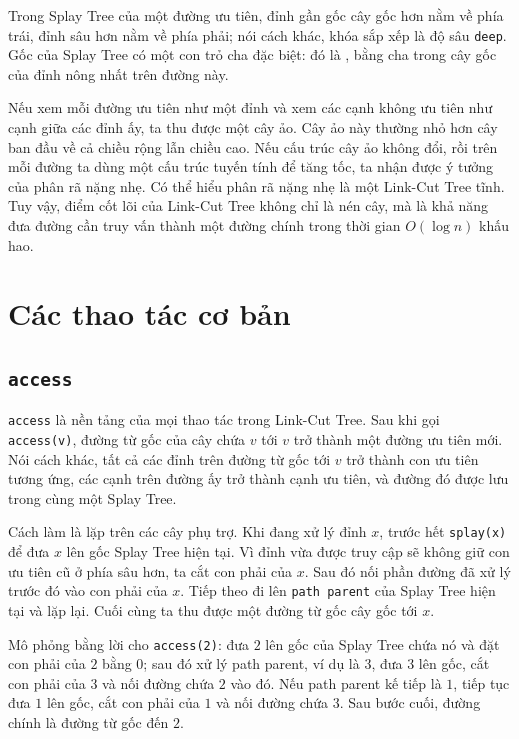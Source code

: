 \documentclass[11pt]{article}
\begin{document}
Trong Splay Tree của một đường ưu tiên, đỉnh gần gốc cây gốc hơn nằm về phía
trái, đỉnh sâu hơn nằm về phía phải; nói cách khác, khóa sắp xếp là độ sâu
\texttt{deep}.  Gốc của Splay Tree có một con trỏ cha đặc biệt: đó là
, bằng cha trong cây gốc của đỉnh nông nhất trên đường này.

Nếu xem mỗi đường ưu tiên như một đỉnh và xem các cạnh không ưu tiên như cạnh
giữa các đỉnh ấy, ta thu được một cây ảo.  Cây ảo này thường nhỏ hơn cây ban
đầu về cả chiều rộng lẫn chiều cao.  Nếu cấu trúc cây ảo không đổi, rồi trên
mỗi đường ta dùng một cấu trúc tuyến tính để tăng tốc, ta nhận được ý tưởng của
phân rã nặng nhẹ.  Có thể hiểu phân rã nặng nhẹ là một Link-Cut Tree tĩnh.  Tuy
vậy, điểm cốt lõi của Link-Cut Tree không chỉ là nén cây, mà là khả năng đưa
đường cần truy vấn thành một đường chính trong thời gian $O(\log n)$ khấu hao.

\section{Các thao tác cơ bản}

\subsection{\texttt{access}}

\texttt{access} là nền tảng của mọi thao tác trong Link-Cut Tree.  Sau khi gọi
\texttt{access(v)}, đường từ gốc của cây chứa $v$ tới $v$ trở thành một đường
ưu tiên mới.  Nói cách khác, tất cả các đỉnh trên đường từ gốc tới $v$ trở
thành con ưu tiên tương ứng, các cạnh trên đường ấy trở thành cạnh ưu tiên, và
đường đó được lưu trong cùng một Splay Tree.

Cách làm là lặp trên các cây phụ trợ.  Khi đang xử lý đỉnh $x$, trước hết
\texttt{splay(x)} để đưa $x$ lên gốc Splay Tree hiện tại.  Vì đỉnh vừa được
truy cập sẽ không giữ con ưu tiên cũ ở phía sâu hơn, ta cắt con phải của $x$.
Sau đó nối phần đường đã xử lý trước đó vào con phải của $x$.  Tiếp theo đi
lên \texttt{path parent} của Splay Tree hiện tại và lặp lại.  Cuối cùng ta thu
được một đường từ gốc cây gốc tới $x$.

Mô phỏng bằng lời cho \texttt{access(2)}: đưa $2$ lên gốc của Splay Tree chứa
nó và đặt con phải của $2$ bằng $0$; sau đó xử lý path parent, ví dụ là $3$,
đưa $3$ lên gốc, cắt con phải của $3$ và nối đường chứa $2$ vào đó.  Nếu path
parent kế tiếp là $1$, tiếp tục đưa $1$ lên gốc, cắt con phải của $1$ và nối
đường chứa $3$.  Sau bước cuối, đường chính là đường từ gốc đến $2$.
\end{document}
